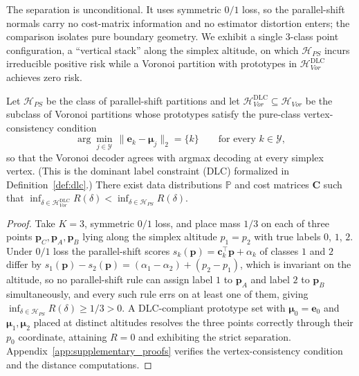 The separation is unconditional. It uses symmetric $0/1$ loss, so the parallel-shift normals carry no cost-matrix information and no estimator distortion enters; the comparison isolates pure boundary geometry. We exhibit a single 3-class point configuration, a ``vertical stack'' along the simplex altitude, on which $\mathcal{H}_{PS}$ incurs irreducible positive risk while a Voronoi partition with prototypes in $\mathcal{H}_{Vor}^{\mathrm{DLC}}$ achieves zero risk.

\begin{theorem}\label{thm:rotational_dominance}
    Let $\mathcal{H}_{PS}$ be the class of parallel-shift partitions and let $\mathcal{H}_{Vor}^{\mathrm{DLC}} \subseteq \mathcal{H}_{Vor}$ be the subclass of Voronoi partitions whose prototypes satisfy the pure-class vertex-consistency condition
    \begin{equation}
        \arg\min_{j \in \mathcal{Y}} \, \|\mathbf{e}_k - \boldsymbol{\mu}_j\|_2 = \{k\} \qquad \text{for every } k \in \mathcal{Y},
        \label{eq:thm_vertex_consistency}
    \end{equation}
    so that the Voronoi decoder agrees with argmax decoding at every simplex vertex. (This is the dominant label constraint (DLC) formalized in Definition~\ref{def:dlc}.) There exist data distributions $\mathbb{P}$ and cost matrices $\mathbf{C}$ such that $\inf_{\delta \in \mathcal{H}_{Vor}^{\mathrm{DLC}}} R(\delta) < \inf_{\delta \in \mathcal{H}_{PS}} R(\delta)$.
\end{theorem}

\begin{proof}
    Take $K = 3$, symmetric $0/1$ loss, and place mass $1/3$ on each of three points $\mathbf{p}_C, \mathbf{p}_A, \mathbf{p}_B$ lying along the simplex altitude $p_1 = p_2$ with true labels $0$, $1$, $2$. Under $0/1$ loss the parallel-shift scores $s_k(\mathbf{p}) = \mathbf{c}_k^\top\mathbf{p} + \alpha_k$ of classes $1$ and $2$ differ by $s_1(\mathbf{p}) - s_2(\mathbf{p}) = (\alpha_1 - \alpha_2) + (p_2 - p_1)$, which is invariant on the altitude, so no parallel-shift rule can assign label $1$ to $\mathbf{p}_A$ and label $2$ to $\mathbf{p}_B$ simultaneously, and every such rule errs on at least one of them, giving $\inf_{\delta \in \mathcal{H}_{PS}} R(\delta) \ge 1/3 > 0$. A DLC-compliant prototype set with $\boldsymbol{\mu}_0 = \mathbf{e}_0$ and $\boldsymbol{\mu}_1, \boldsymbol{\mu}_2$ placed at distinct altitudes resolves the three points correctly through their $p_0$ coordinate, attaining $R = 0$ and exhibiting the strict separation. Appendix~\ref{app:supplementary_proofs} verifies the vertex-consistency condition and the distance computations.
\end{proof}

